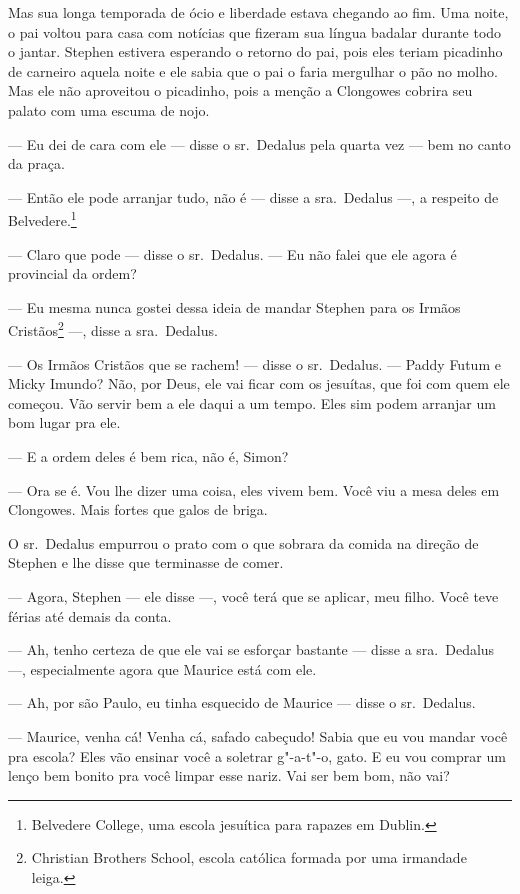 Mas sua longa temporada de ócio e liberdade estava chegando ao fim. Uma
noite, o pai voltou para casa com notícias que fizeram sua língua
badalar durante todo o jantar. Stephen estivera esperando o retorno do
pai, pois eles teriam picadinho de carneiro aquela noite e ele sabia
que o pai o faria mergulhar o pão no molho. Mas ele não aproveitou o
picadinho, pois a menção a Clongowes cobrira seu palato com uma escuma
de nojo.

 --- Eu dei de cara com ele --- disse o sr.~Dedalus pela quarta vez --- bem no
canto da praça.

 --- Então ele pode arranjar tudo, não é --- disse a sra.~Dedalus ---, a respeito
de Belvedere.\footnote{ Belvedere College, uma escola jesuítica para
rapazes em Dublin.}

 --- Claro que pode --- disse o sr.~Dedalus. --- Eu não falei que ele agora é
provincial da ordem?

--- Eu mesma nunca gostei dessa ideia de mandar Stephen para os Irmãos
Cristãos\footnote{ Christian Brothers School, escola católica formada
por uma irmandade leiga.} ---, disse a sra.~Dedalus.

 --- Os Irmãos Cristãos que se rachem! --- disse o sr.~Dedalus. --- Paddy Futum e
Micky Imundo? Não, por Deus, ele vai ficar com os jesuítas, que foi com
quem ele começou. Vão servir bem a ele daqui a um tempo. Eles sim podem
arranjar um bom lugar pra ele.

 --- E a ordem deles é bem rica, não é, Simon?

 --- Ora se é. Vou lhe dizer uma coisa, eles vivem bem. Você viu a mesa
deles em Clongowes. Mais fortes que galos de briga.

O sr.~Dedalus empurrou o prato com o que sobrara da comida na direção de
Stephen e lhe disse que terminasse de comer.

 --- Agora, Stephen --- ele disse ---, você terá que se aplicar, meu filho. Você
teve férias até demais da conta.

--- Ah, tenho certeza de que ele vai se esforçar bastante --- disse a sra.~Dedalus ---, 
especialmente agora que Maurice está com ele.

--- Ah, por são Paulo, eu tinha esquecido de Maurice --- disse o sr.~Dedalus.

 --- Maurice, venha cá! Venha cá, safado cabeçudo! Sabia que eu vou mandar
você pra escola? Eles vão ensinar você a soletrar g"-a-t"-o, gato. E eu
vou comprar um lenço bem bonito pra você limpar esse nariz. Vai ser
bem bom, não vai?

